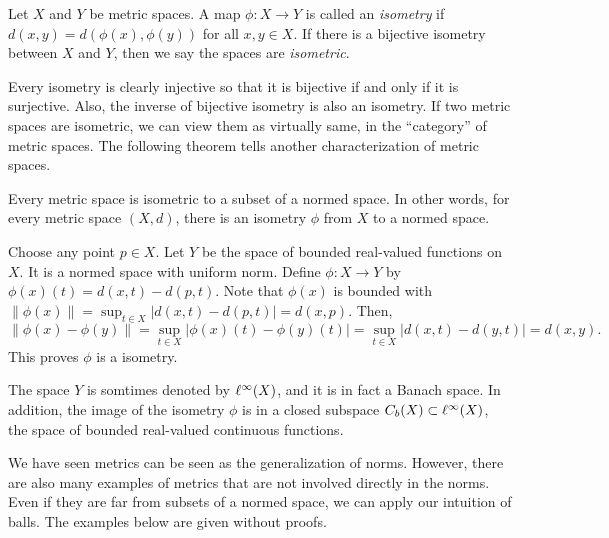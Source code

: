 \documentclass{../crs}
\begin{document}
\begin{defn}
Let $X$ and $Y$ be metric spaces.
A map $\phi:X\to Y$ is called an \emph{isometry} if $d(x,y)=d(\phi(x),\phi(y))$ for all $x,y\in X$.
If there is a bijective isometry between $X$ and $Y$, then we say the spaces are \emph{isometric}.
\end{defn}

Every isometry is clearly injective so that it is bijective if and only if it is surjective.
Also, the inverse of bijective isometry is also an isometry.
If two metric spaces are isometric, we can view them as virtually same, in the ``category'' of metric spaces.
The following theorem tells another characterization of metric spaces.

\begin{prop}
Every metric space is isometric to a subset of a normed space.
In other words, for every metric space $(X,d)$, there is an isometry $\phi$ from $X$ to a normed space.
\end{prop}
\begin{pf}
Choose any point $p\in X$.
Let $Y$ be the space of bounded real-valued functions on $X$.
It is a normed space with uniform norm.
Define $\phi:X\to Y$ by $\phi(x)(t)=d(x,t)-d(p,t)$.
Note that $\phi(x)$ is bounded with $\|\phi(x)\|=\sup_{t\in X}|d(x,t)-d(p,t)|=d(x,p)$.
Then,
\[\|\phi(x)-\phi(y)\|=\sup_{t\in X}|\phi(x)(t)-\phi(y)(t)|=\sup_{t\in X}|d(x,t)-d(y,t)|=d(x,y).\]
This proves $\phi$ is a isometry.
\end{pf}
\begin{rmk}
The space $Y$ is somtimes denoted by $\ell^\infty(X)$, and it is in fact a Banach space.
In addition, the image of the isometry $\phi$ is in a closed subspace $C_b(X)\subset\ell^\infty(X)$, the space of bounded real-valued continuous functions.
\end{rmk}

We have seen metrics can be seen as the generalization of norms.
However, there are also many examples of metrics that are not involved directly in the norms.
Even if they are far from subsets of a normed space, we can apply our intuition of balls.
The examples below are given without proofs.
\end{document}
